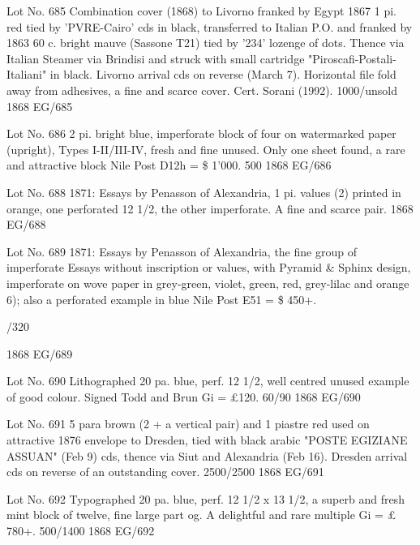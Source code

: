 \documentclass[justified]{tufte-book}
\begin{document}
%
{Lot No. 685
Combination cover (1868) to Livorno franked by Egypt 1867 1 pi. red tied by 'PVRE-Cairo' cds in black, transferred to Italian P.O. and franked by 1863 60 c. bright mauve (Sassone T21) tied by '234' lozenge of dots. Thence via Italian Steamer via Brindisi and struck with small cartridge "Piroscafi-Postali-Italiani" in black. Livorno arrival cds on reverse (March 7). Horizontal file fold away from adhesives, a fine and scarce cover. Cert. Sorani (1992). 1000/unsold
}%
{1868}%
{EG/685}%
{}%
{}
{}%
{}

%
{Lot No. 686
2 pi. bright blue, imperforate block of four on watermarked paper (upright), Types I-II/III-IV, fresh and fine unused. Only one sheet found, a rare and attractive block Nile Post D12h = \$ 1'000. 500
}%
{1868}%
{EG/686}%
{}%
{}
{}%
{}


%
{Lot No. 688
1871: Essays by Penasson of Alexandria, 1 pi. values (2) printed in orange, one perforated 12 1/2, the other imperforate. A fine and scarce pair.
}%
{1868}%
{EG/688}%
{}%
{}
{}%
{}


%
{Lot No. 689
1871: Essays by Penasson of Alexandria, the fine group of imperforate Essays without inscription or values, with Pyramid \& Sphinx design, imperforate on wove paper in grey-green, violet, green, red, grey-lilac and orange 6); also a perforated example in blue Nile Post E51 = \$ 450+.

/320 

}%
{1868}%
{EG/689}%
{}%
{}
{}%
{}


%
{Lot No. 690
Lithographed 20 pa. blue, perf. 12 1/2, well centred unused example of good colour. Signed Todd and Brun Gi = \pounds{120}.
60/90 
}%
{1868}%
{EG/690}%
{}%
{}
{}%
{}


%
{Lot No. 691
5 para brown (2 + a vertical pair) and 1 piastre red used on attractive 1876 envelope to Dresden, tied with black arabic "POSTE EGIZIANE ASSUAN" (Feb 9) cds, thence via Siut and Alexandria (Feb 16). Dresden arrival cds on reverse of an outstanding cover. 2500/2500
}%
{1868}%
{EG/691}%
{}%
{}
{}%
{}

%
{Lot No. 692
Typographed 20 pa. blue, perf. 12 1/2 x 13 1/2, a superb and fresh mint block of twelve, fine large part og. A delightful and rare multiple Gi = £ 780+. 500/1400
}%
{1868}%
{EG/692}%
{}%
{}
{}%
{}
\end{document}
